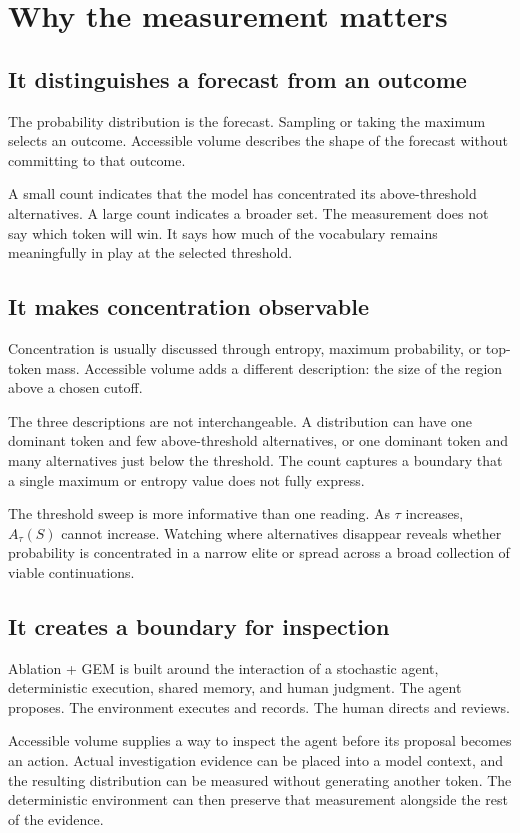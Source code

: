 \documentclass[11pt,a4paper]{article}
\begin{document}
\section{Why the measurement matters}
\subsection{It distinguishes a forecast from an outcome}
The probability distribution is the forecast. Sampling or taking the maximum selects an outcome. Accessible volume describes the shape of the forecast without committing to that outcome.

A small count indicates that the model has concentrated its above-threshold alternatives. A large count indicates a broader set. The measurement does not say which token will win. It says how much of the vocabulary remains meaningfully in play at the selected threshold.

\subsection{It makes concentration observable}
Concentration is usually discussed through entropy, maximum probability, or top-token mass. Accessible volume adds a different description: the size of the region above a chosen cutoff.

The three descriptions are not interchangeable. A distribution can have one dominant token and few above-threshold alternatives, or one dominant token and many alternatives just below the threshold. The count captures a boundary that a single maximum or entropy value does not fully express.

The threshold sweep is more informative than one reading. As $\tau$ increases, $A_\tau(S)$ cannot increase. Watching where alternatives disappear reveals whether probability is concentrated in a narrow elite or spread across a broad collection of viable continuations.

\subsection{It creates a boundary for inspection}
Ablation + GEM is built around the interaction of a stochastic agent, deterministic execution, shared memory, and human judgment. The agent proposes. The environment executes and records. The human directs and reviews.

Accessible volume supplies a way to inspect the agent before its proposal becomes an action. Actual investigation evidence can be placed into a model context, and the resulting distribution can be measured without generating another token. The deterministic environment can then preserve that measurement alongside the rest of the evidence.
\end{document}
